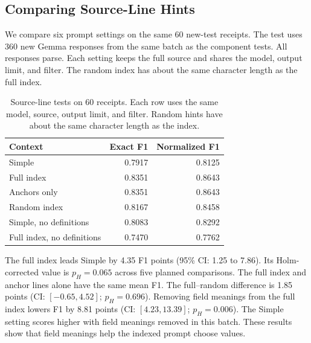 \subsection{Comparing Source-Line Hints}
\label{sec:eval:recovery_ablation}

We compare six prompt settings on the same 60 new-test receipts.
The test uses 360 new Gemma responses from the same batch as the component
tests. All responses parse. Each setting keeps the full source and shares
the model, output limit, and filter.
The random index has about the same character length as the full index.

\begin{table}[t]

\centering

\caption{Source-line tests on 60 receipts. Each row uses the same model, source, output limit, and filter. Random hints have about the same character length as the index.}
\label{tab:recovery_index}

\small

\begin{tabular}{lrr}

\toprule

Context & Exact F1 & Normalized F1 \\

\midrule

Simple & 0.7917 & 0.8125 \\

Full index & 0.8351 & 0.8643 \\

Anchors only & 0.8351 & 0.8643 \\

Random index & 0.8167 & 0.8458 \\

Simple, no definitions & 0.8083 & 0.8292 \\

Full index, no definitions & 0.7470 & 0.7762 \\

\bottomrule

\end{tabular}

\end{table}

The full index leads Simple by 4.35 F1 points (95\% CI: 1.25 to 7.86).
Its Holm-corrected value is $p_H=0.065$ across five planned comparisons.
The full index and anchor lines alone have the same mean F1.
The full--random difference is 1.85 points
(CI: $[-0.65,4.52]$; $p_H=0.696$).
Removing field meanings from the full index lowers F1 by 8.81 points
(CI: $[4.23,13.39]$; $p_H=0.006$).
The Simple setting scores higher with field meanings removed in this batch.
These results show that field meanings help the indexed prompt choose values.

